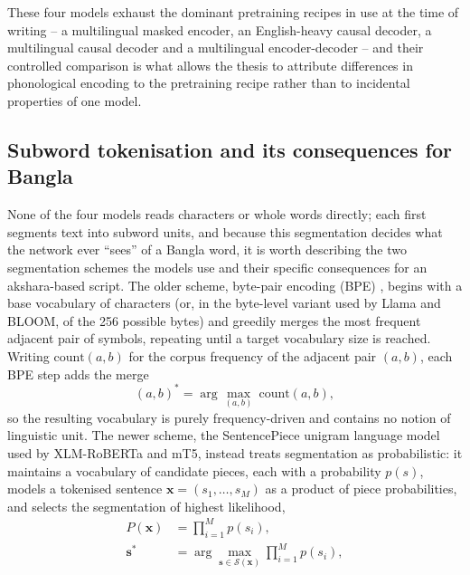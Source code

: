 These four models exhaust the dominant pretraining recipes in use at the time of writing -- a multilingual masked encoder, an English-heavy causal decoder, a multilingual causal decoder and a multilingual encoder-decoder -- and their controlled comparison is what allows the thesis to attribute differences in phonological encoding to the pretraining recipe rather than to incidental properties of one model.

\subsection{Subword tokenisation and its consequences for Bangla}
\label{sec:tokenisation}

None of the four models reads characters or whole words directly; each first segments text into subword units, and because this segmentation decides what the network ever ``sees'' of a Bangla word, it is worth describing the two segmentation schemes the models use and their specific consequences for an akshara-based script. The older scheme, byte-pair encoding (BPE) \cite{sennrich2016bpe}, begins with a base vocabulary of characters (or, in the byte-level variant used by Llama and BLOOM, of the 256 possible bytes) and greedily merges the most frequent adjacent pair of symbols, repeating until a target vocabulary size is reached. Writing $\mathrm{count}(a,b)$ for the corpus frequency of the adjacent pair $(a,b)$, each BPE step adds the merge
\begin{equation}
\label{eq:bpe}
(a,b)^{\ast} = \arg\max_{(a,b)}\ \mathrm{count}(a,b),
\end{equation}
so the resulting vocabulary is purely frequency-driven and contains no notion of linguistic unit. The newer scheme, the SentencePiece unigram language model \cite{kudo2018sentencepiece} used by XLM-RoBERTa and mT5, instead treats segmentation as probabilistic: it maintains a vocabulary of candidate pieces, each with a probability $p(s)$, models a tokenised sentence $\mathbf{x}=(s_1,\dots,s_M)$ as a product of piece probabilities, and selects the segmentation of highest likelihood,
\begin{equation}
\label{eq:unigram}
\begin{aligned}
P(\mathbf{x}) &= \prod_{i=1}^{M} p(s_i), \\
\mathbf{s}^{\ast} &= \arg\max_{\mathbf{s}\in \mathcal{S}(\mathbf{x})} \prod_{i=1}^{M} p(s_i),
\end{aligned}
\end{equation}
